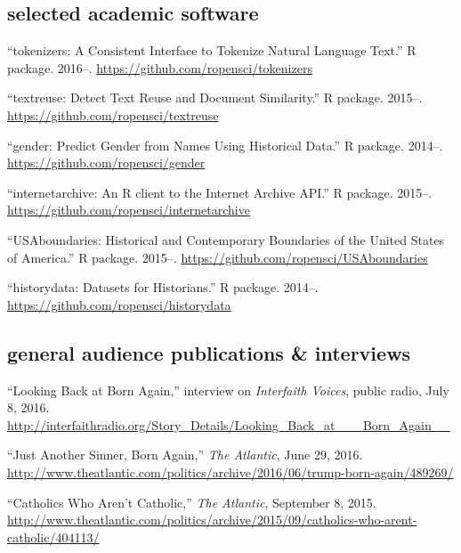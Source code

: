 \documentclass[11pt]{article}
\begin{document}



\subsection{selected academic software}\label{academic-software}

``tokenizers: A Consistent Interface to Tokenize Natural Language Text.'' R 
package. 2016--. \url{https://github.com/ropensci/tokenizers}

``textreuse: Detect Text Reuse and Document Similarity.'' R package. 2015--. 
\url{https://github.com/ropensci/textreuse}

``gender: Predict Gender from Names Using Historical Data.'' R package. 
2014--. \url{https://github.com/ropensci/gender}

``internetarchive: An R client to the Internet Archive API.'' R package.  
2015--. \url{https://github.com/ropensci/internetarchive}

``USAboundaries: Historical and Contemporary Boundaries of the United States 
of America.'' R package.  2015--.  
\url{https://github.com/ropensci/USAboundaries}

``historydata: Datasets for Historians.'' R package. 2014--.  
\url{https://github.com/ropensci/historydata}

\subsection{general audience publications \& interviews}\label{public}

``Looking Back at Born Again,'' interview on \emph{Interfaith Voices}, public 
radio, July 8, 2016.  
\url{http://interfaithradio.org/Story_Details/Looking_Back_at___Born_Again__}

``Just Another Sinner, Born Again,'' \emph{The Atlantic}, June 29, 2016. 
\url{http://www.theatlantic.com/politics/archive/2016/06/trump-born-again/489269/}

``Catholics Who Aren't Catholic,'' \emph{The Atlantic}, September 8, 
2015.  
\url{http://www.theatlantic.com/politics/archive/2015/09/catholics-who-arent-catholic/404113/}
\end{document}
